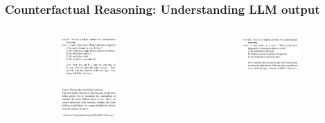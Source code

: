 \documentclass{beamer}
\begin{document}
\begin{frame}
	\frametitle{Counterfactual Reasoning: Understanding LLM output}
	\begin{columns}
		\begin{column}{0.5\textwidth}
			\begin{figure}
				\begin{subfigure}{\textwidth}
					\centering
					\includegraphics[scale=0.55]{imgs/counterfactual_prompt1.png}
				\end{subfigure}
				\begin{subfigure}{\textwidth}
					\centering
					\includegraphics[scale=0.55]{imgs/counterfactual_prompt2.png}	
				\end{subfigure}
			\end{figure}
		\end{column}
		\begin{column}{0.5\textwidth}
			\begin{figure}
				\begin{subfigure}{\textwidth}
					\centering
					\includegraphics[scale=0.55]{imgs/counterfactual_prompt3.png}

\end{subfigure}
\end{figure}
\end{column}
\end{columns}
\end{frame}
\end{document}
